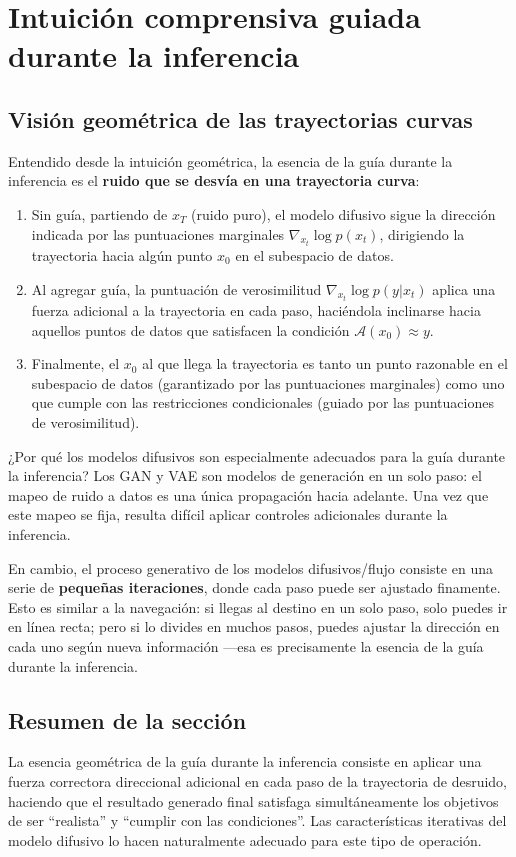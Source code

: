 \section{Intuición comprensiva guiada durante la inferencia}

\subsection{Visión geométrica de las trayectorias curvas}

Entendido desde la intuición geométrica, la esencia de la guía durante la inferencia es el \textbf{ruido que se desvía en una trayectoria curva}:

\begin{enumerate}
    \item Sin guía, partiendo de $x_T$ (ruido puro), el modelo difusivo sigue la dirección indicada por las puntuaciones marginales $\nabla_{x_t} \log p(x_t)$, dirigiendo la trayectoria hacia algún punto $x_0$ en el subespacio de datos.
    \item Al agregar guía, la puntuación de verosimilitud $\nabla_{x_t} \log p(y|x_t)$ aplica una fuerza adicional a la trayectoria en cada paso, haciéndola inclinarse hacia aquellos puntos de datos que satisfacen la condición $\mathcal{A}(x_0) \approx y$.
    \item Finalmente, el $x_0$ al que llega la trayectoria es tanto un punto razonable en el subespacio de datos (garantizado por las puntuaciones marginales) como uno que cumple con las restricciones condicionales (guiado por las puntuaciones de verosimilitud).
\end{enumerate}

\begin{knowledgebox}{¿Por qué los modelos difusivos son especialmente adecuados para la guía durante la inferencia?}
Los GAN y VAE son modelos de generación en un solo paso: el mapeo de ruido a datos es una única propagación hacia adelante. Una vez que este mapeo se fija, resulta difícil aplicar controles adicionales durante la inferencia.

En cambio, el proceso generativo de los modelos difusivos/flujo consiste en una serie de \textbf{pequeñas iteraciones}, donde cada paso puede ser ajustado finamente. Esto es similar a la navegación: si llegas al destino en un solo paso, solo puedes ir en línea recta; pero si lo divides en muchos pasos, puedes ajustar la dirección en cada uno según nueva información —esa es precisamente la esencia de la guía durante la inferencia.
\end{knowledgebox}

\subsection{Resumen de la sección}

La esencia geométrica de la guía durante la inferencia consiste en aplicar una fuerza correctora direccional adicional en cada paso de la trayectoria de desruido, haciendo que el resultado generado final satisfaga simultáneamente los objetivos de ser ``realista'' y ``cumplir con las condiciones''. Las características iterativas del modelo difusivo lo hacen naturalmente adecuado para este tipo de operación.
